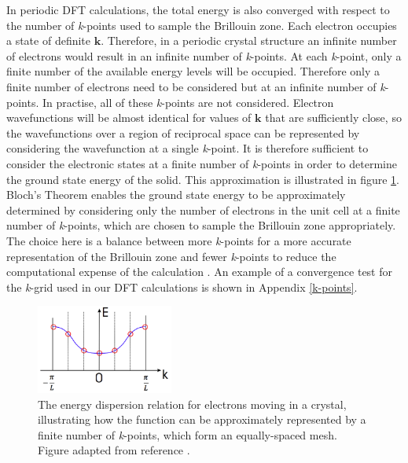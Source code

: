 In periodic DFT calculations, the total energy is also converged with respect to  the number of \textit{k}-points used to sample the Brillouin zone.
Each electron occupies a state of definite $\mathbf{k}$. Therefore, in a periodic crystal structure an infinite number of electrons would result in an infinite number of \textit{k}-points. At each \textit{k}-point, only a finite number of the available energy levels will be occupied. Therefore only a finite number of electrons need to be considered but at an infinite number of \textit{k}-points. In practise, all of these \textit{k}-points are not considered. 
Electron wavefunctions will be almost identical for values of $\mathbf{k}$ that are sufficiently close, so the wavefunctions over a region of reciprocal space can be represented by considering the wavefunction at a single \textit{k}-point. It is therefore sufficient to consider the electronic states at a finite number of \textit{k}-points in order to determine the ground state energy of the solid. This approximation is illustrated in figure \ref{energy_dispersion_app}. Bloch's Theorem enables the ground state energy to be approximately determined by considering only the number of electrons in the unit cell at a finite number of \textit{k}-points, which are chosen to sample the Brillouin zone appropriately. The choice here is a balance between more \textit{k}-points for a more accurate representation of the Brillouin zone and fewer \textit{k}-points to reduce the computational expense of the calculation \cite{bloch-thesis}. An example of a convergence test for the \textit{k}-grid used in our DFT calculations is shown in Appendix \ref{k-points}. 
\begin{figure}[h!]
  \centering
    \includegraphics[width=0.4\textwidth]{figures/energy_dispersion.png}
    \caption{The energy dispersion relation for electrons moving in a crystal, illustrating how the function can be approximately represented by a finite number of \textit{k}-points, which form an equally-spaced mesh. Figure adapted from reference .}
  \label{energy_dispersion_app}
\end{figure}

